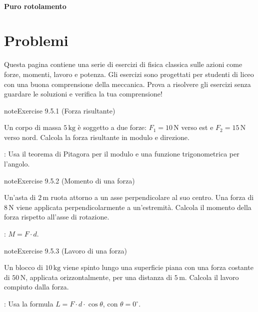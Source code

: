 \documentclass[letterpaper,10pt,italian]{jupyterBook}
\begin{document}
\paragraph{Puro rotolamento}
\label{\detokenize{ch/mechanics/actions-examples:puro-rotolamento}}
\sphinxstepscope


\section{Problemi}
\label{\detokenize{ch/mechanics/actions-problems:problemi}}\label{\detokenize{ch/mechanics/actions-problems::doc}}
\sphinxAtStartPar
Questa pagina contiene una serie di esercizi di fisica classica sulle azioni come forze, momenti, lavoro e potenza. Gli esercizi sono progettati per studenti di liceo con una buona comprensione della meccanica. Prova a risolvere gli esercizi senza guardare le soluzioni e verifica la tua comprensione!
 \label{exercise:ch/mechanics/actions-problems-exercise-0}

\begin{sphinxadmonition}{note}{Exercise 9.5.1 (Forza risultante)}



\sphinxAtStartPar
Un corpo di massa \(5 \, \text{kg}\) è soggetto a due forze: \(F_1 = 10 \, \text{N}\) verso est e \(F_2 = 15 \, \text{N}\) verso nord. Calcola la forza risultante in modulo e direzione.

\sphinxAtStartPar
{}: Usa il teorema di Pitagora per il modulo e una funzione trigonometrica per l’angolo.
\end{sphinxadmonition}
 \label{exercise:ch/mechanics/actions-problems-exercise-1}

\begin{sphinxadmonition}{note}{Exercise 9.5.2 (Momento di una forza)}



\sphinxAtStartPar
Un’asta di \(2 \, \text{m}\) ruota attorno a un asse perpendicolare al suo centro. Una forza di \(8 \, \text{N}\) viene applicata perpendicolarmente a un’estremità. Calcola il momento della forza rispetto all’asse di rotazione.

\sphinxAtStartPar
{}: \( M = F \cdot d \).
\end{sphinxadmonition}
 \label{exercise:ch/mechanics/actions-problems-exercise-2}

\begin{sphinxadmonition}{note}{Exercise 9.5.3 (Lavoro di una forza)}



\sphinxAtStartPar
Un blocco di \(10 \, \text{kg}\) viene spinto lungo una superficie piana con una forza costante di \(50 \, \text{N}\), applicata orizzontalmente, per una distanza di \(5 \, \text{m}\). Calcola il lavoro compiuto dalla forza.

\sphinxAtStartPar
{}: Usa la formula \( L = F \cdot d \cdot \cos\theta \), con \(\theta = 0^\circ\).
\end{sphinxadmonition}
 \label{exercise:ch/mechanics/actions-problems-exercise-3}
\end{document}
